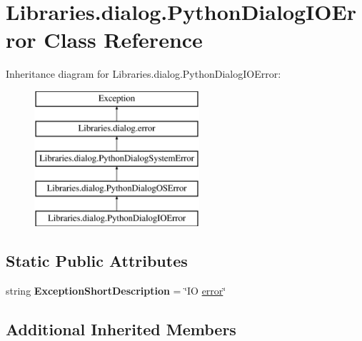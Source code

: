\hypertarget{class_libraries_1_1dialog_1_1_python_dialog_i_o_error}{}\section{Libraries.\+dialog.\+Python\+Dialog\+I\+O\+Error Class Reference}
\label{class_libraries_1_1dialog_1_1_python_dialog_i_o_error}
Inheritance diagram for Libraries.\+dialog.\+Python\+Dialog\+I\+O\+Error\+:\begin{figure}[H]
\begin{center}
\leavevmode
\includegraphics[height=5.000000cm]{class_libraries_1_1dialog_1_1_python_dialog_i_o_error}
\end{center}
\end{figure}
\subsection*{Static Public Attributes}
\begin{DoxyCompactItemize}
\item 
string {\bfseries Exception\+Short\+Description} = \char`\"{}IO \hyperlink{class_libraries_1_1dialog_1_1error}{error}\char`\"{}\hypertarget{class_libraries_1_1dialog_1_1_python_dialog_i_o_error_a5038ad6bb43c104d2b9a8bd7a7d55956}{}\label{class_libraries_1_1dialog_1_1_python_dialog_i_o_error_a5038ad6bb43c104d2b9a8bd7a7d55956}

\end{DoxyCompactItemize}
\subsection*{Additional Inherited Members}


